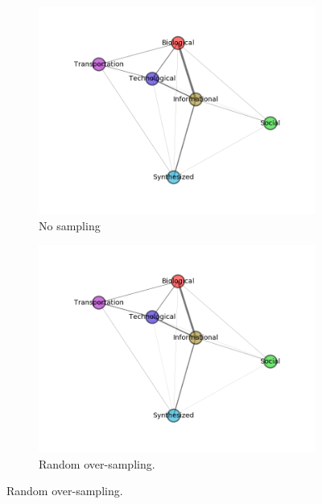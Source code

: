 \documentclass[..]{revtex4}
\begin{document}
\begin{figure}[H]
\begin{subfigure}{0.48\textwidth}
\includegraphics[width=\linewidth]{figs/similarity/Domain/None/g.png}
\caption{No sampling} \label{no_graph}
\end{subfigure}\hspace*{\fill}
\begin{subfigure}{0.48\textwidth}
\includegraphics[width=\linewidth]{figs/similarity/Domain/RandomOver/g.png}
\caption{Random over-sampling.} \label{random_over_graph}
\end{subfigure}


\end{figure}
\end{document}
